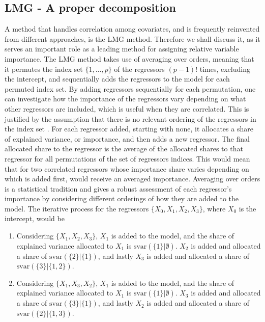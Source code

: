 \subsection{LMG - A proper decomposition}
\label{sec:lmg}
A method that handles correlation among covariates, and is frequently reinvented\citep{gromping_relaimpo} from different approaches, is the LMG method.
Therefore we shall discuss it, as it serves an important role as a leading method for assigning relative variable importance.  
The LMG method takes use of averaging over orders, meaning that it permutes the index set $\{1, ..., p\}$  of the regressors $(p-1)!$ times, excluding the intercept, and sequentially adds the regressors to the model for each permuted index set.
By adding regressors sequentially for each permutation, one can investigate how the importance of the regressors vary depending on what other regressors are included, which is useful when they are correlated.
This is justified by the assumption that there is no relevant ordering of the regressors in the index set \citep{kruskal_lmg_1987}.
For each regressor added, starting with none, it allocates a share of explained variance, or importance, and then adds a new regressor.
The final allocated share to the regressor is the average of the allocated shares to that regressor for all permutations of the set of regressors indices. 
This would mean that for two correlated regressors whose importance share varies depending on which is added first, would receive an averaged importance.
Averaging over orders is a statistical tradition \citep{kruskal_lmg_1987} and gives a robust assessment of each regressor's importance by considering different orderings of how they are added to the model. 
The iterative process for the regressors $\{X_0, X_1, X_2, X_3\}$, where $X_0$ is the intercept, would be
\begin{enumerate}
    \item Considering $\{X_1, X_2, X_3\}$,  $X_1$ is added to the model, and the share of explained variance allocated to $X_1$ is $\text{svar}(\{1\} \lvert \emptyset)$. $X_2$ is added and allocated a share of $\text{svar}(\{2\} \lvert \{1\})$, and lastly $X_3$ is added and allocated a share of $\text{svar}(\{3\} \lvert \{1, 2\})$.
    \item Considering $\{X_1, X_3, X_2\}$,  $X_1$ is added to the model, and the share of explained variance allocated to $X_1$ is $\text{svar}(\{1\} \lvert \emptyset)$. $X_3$ is added and allocated a share of $\text{svar}(\{3\} \lvert \{1\})$, and lastly $X_2$ is added and allocated a share of $\text{svar}(\{2\} \lvert \{1, 3\})$.
\end{enumerate}
